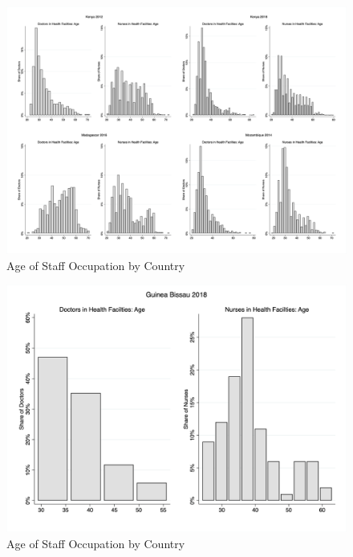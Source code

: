 \documentclass{article}                 %
\begin{document}
			\begin{figure}[H] 
				\centering
				\caption{Age of Staff Occupation  by Country} 
				\includegraphics[width=\textwidth]{"../Output/Final/Hist_age_3"}
			\end{figure}
		
			\begin{figure}[H] 
				\centering
				\caption{Age of Staff Occupation  by Country} 
				\includegraphics[width=\textwidth]{"../Output/Final/Hist_age_4"}
			\end{figure}
			
\end{document}

